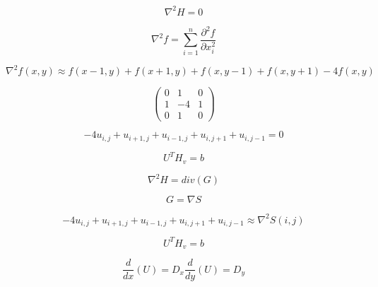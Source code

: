 \begin{equation*}
\nabla^2 H = 0
\end{equation*}

\begin{equation*}
 \nabla^2 f = \sum_{i=1}^n \frac{\partial^2 f}{\partial x_i^2}
\end{equation*}

\begin{equation*}
 \nabla^2 f(x,y) \approx f(x-1,y) + f(x+1,y) + f(x,y-1) + f(x,y+1) - 4f(x,y)
\end{equation*}

\begin{equation*}
\begin{pmatrix}
0 & 1 & 0 \\
1 & -4 & 1\\
0 & 1 & 0
\end{pmatrix}
\end{equation*}

\begin{equation*}
-4 u_{i,j} + u_{i+1,j} + u_{i-1,j} + u_{i,j+1} + u_{i,j-1} = 0
\end{equation*}

\begin{equation*}
 U^T H_v = b
\end{equation*}

\begin{equation*}
\nabla^2 H = div(G)
\end{equation*}

\begin{equation*}
G = \nabla S
\end{equation*}

\begin{equation*}
-4 u_{i,j} + u_{i+1,j} + u_{i-1,j} + u_{i,j+1} + u_{i,j-1} \approx \nabla^2 S(i,j)
\end{equation*}

\begin{equation*}
 U^T H_v = b
\end{equation*}

\begin{equation*}
\frac{d}{dx}(U) = D_x

\frac{d}{dy}(U) = D_y
\end{equation*}

